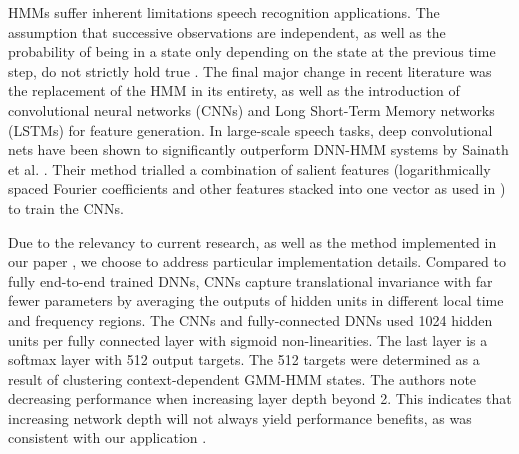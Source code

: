 \documentclass[12pt]{llncs}
\newcommand{\ikN}[1]{\todo[inline, size=\small, color=orange!30]{[ik] #1}}
\begin{document}





HMMs suffer inherent limitations speech recognition applications. The assumption that successive observations are independent, as well as the probability of being in a state only depending on the state at the previous time step, do not strictly hold true \cite{rabiner1989tutorial}. The final major change in recent literature was the replacement of the HMM in its entirety, as well as the introduction of convolutional neural networks (CNNs) and Long Short-Term Memory networks (LSTMs) for feature generation. In large-scale speech tasks, deep convolutional nets have been shown to significantly outperform DNN-HMM systems by Sainath et al. \cite{sainath2015deep}. Their method trialled a combination of salient features (logarithmically spaced Fourier coefficients and other features stacked into one vector as used in \cite{soltau2010ibm}) to train the CNNs.

Due to the relevancy to current research, as well as the method implemented in our paper \cite{kiskin2017mosquito}, we choose to address particular implementation details. Compared to fully end-to-end trained DNNs, CNNs capture translational invariance with far fewer parameters by averaging the outputs of hidden units in different local time and frequency regions. The CNNs and fully-connected DNNs used 1024 hidden units per fully connected layer with sigmoid non-linearities. The last layer is a softmax layer with 512 output targets. The 512 targets were determined as a result of clustering context-dependent GMM-HMM states. The authors note decreasing performance when increasing layer depth beyond 2. This indicates that increasing network depth will not always yield performance benefits, as was consistent with our application \cite[Section 3.2]{kiskin2017mosquito}.
	
 
\end{document}
